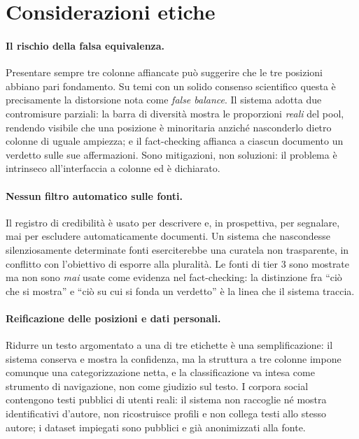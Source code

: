 \documentclass[11pt,a4paper]{report}
\begin{document}
\section{Considerazioni etiche}\label{sec:etica}
\paragraph{Il rischio della falsa equivalenza.} Presentare sempre tre colonne affiancate può
suggerire che le tre posizioni abbiano pari fondamento. Su temi con un solido consenso scientifico
questa è precisamente la distorsione nota come \emph{false balance}. Il sistema adotta due
contromisure parziali: la barra di diversità mostra le proporzioni \emph{reali} del pool, rendendo
visibile che una posizione è minoritaria anziché nasconderlo dietro colonne di uguale ampiezza; e il
fact-checking affianca a ciascun documento un verdetto sulle sue affermazioni. Sono mitigazioni, non
soluzioni: il problema è intrinseco all'interfaccia a colonne ed è dichiarato.

\paragraph{Nessun filtro automatico sulle fonti.} Il registro di credibilità è usato per descrivere
e, in prospettiva, per segnalare, mai per escludere automaticamente documenti. Un sistema che
nascondesse silenziosamente determinate fonti eserciterebbe una curatela non trasparente, in
conflitto con l'obiettivo di esporre alla pluralità. Le fonti di tier 3 sono mostrate ma non sono
\emph{mai} usate come evidenza nel fact-checking: la distinzione fra ``ciò che si mostra'' e ``ciò
su cui si fonda un verdetto'' è la linea che il sistema traccia.

\paragraph{Reificazione delle posizioni e dati personali.} Ridurre un testo argomentato a una di tre
etichette è una semplificazione: il sistema conserva e mostra la confidenza, ma la struttura a tre
colonne impone comunque una categorizzazione netta, e la classificazione va intesa come strumento
di navigazione, non come giudizio sul testo. I corpora social contengono testi pubblici di utenti
reali: il sistema non raccoglie né mostra identificativi d'autore, non ricostruisce profili e non
collega testi allo stesso autore; i dataset impiegati sono pubblici e già anonimizzati alla fonte.
\end{document}
